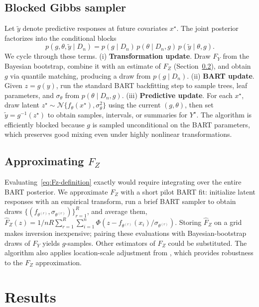 \documentclass[10pt]{article}
\begin{document}
\subsection{Blocked Gibbs sampler}
Let $\tilde y$ denote predictive responses at future covariates $x^\star$. The joint posterior factorizes into the conditional blocks
\begin{equation}
 p(g,\theta,\tilde y\mid D_n) = p(g\mid D_n)\, p(\theta\mid D_n, g)\, p(\tilde y\mid \theta, g).
\end{equation}
We cycle through these terms. (i) \textbf{Transformation update}. Draw $F_Y$ from the Bayesian bootstrap, combine it with an estimate of $F_Z$ (Section~\ref{subsec:Fz-approx}), and obtain $g$ via quantile matching, producing a draw from $p(g\mid D_n)$. (ii) \textbf{BART update}. Given $z=g(y)$, run the standard BART backfitting step to sample trees, leaf parameters, and $\sigma_\theta$ from $p(\theta \mid D_n, g)$. (iii) \textbf{Predictive update}. For each $x^\star$, draw latent $z^\star \sim \mathcal N\{f_\theta(x^\star), \sigma_\theta^2\}$ using the current $(g,\theta)$, then set $\tilde y = g^{-1}(z^\star)$ to obtain samples, intervals, or summaries for $Y^\star$. The algorithm is efficiently blocked because $g$ is sampled unconditional on the BART parameters, which preserves good mixing even under highly nonlinear transformations.

\subsection{Approximating $F_Z$}\label{subsec:Fz-approx}
Evaluating~\eqref{eq:Fz-definition} exactly would require integrating over the entire BART posterior. We approximate $F_Z$ with a short pilot BART fit: initialize latent responses with an empirical transform, run a brief BART sampler to obtain draws $\{(f_{\theta^{(r)}},\sigma_{\theta^{(r)}})\}_{r=1}^R$, and average them, $ \widehat F_Z(z) = {1}/{nR}\sum_{r=1}^R\sum_{i=1}^n \Phi\!\left({z - f_{\theta^{(r)}}(x_i)}/{\sigma_{\theta^{(r)}}}\right)$. Storing $\widehat F_Z$ on a grid makes inversion inexpensive; pairing these evaluations with Bayesian-bootstrap draws of $F_Y$ yields $g$-samples. Other estimators of $F_Z$ could be substituted. The algorithm also applies location-scale adjustment from , which provides robustness to the $F_Z$ approximation.

\section{Results}
\end{document}

